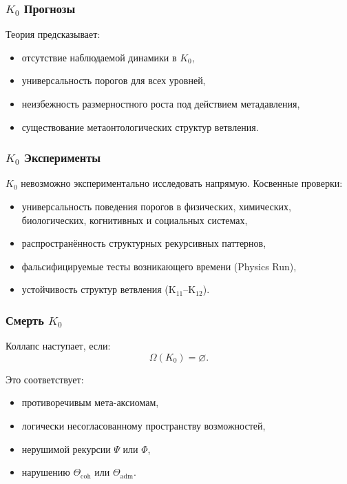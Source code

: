 \subsubsection{\texorpdfstring{$K_0$}{K_0} Прогнозы}

Теория предсказывает:
\begin{itemize}
    \item отсутствие наблюдаемой динамики в $K_0$,
    \item универсальность порогов для всех уровней,
    \item неизбежность размерностного роста под действием метадавления,
    \item существование метаонтологических структур ветвления.
\end{itemize}

\subsubsection{\texorpdfstring{$K_0$}{K_0} Эксперименты}

$K_0$ невозможно экспериментально исследовать напрямую.
Косвенные проверки:
\begin{itemize}
    \item универсальность поведения порогов в физических,
          химических, биологических, когнитивных и социальных системах,
    \item распространённость структурных рекурсивных паттернов,
    \item фальсифицируемые тесты возникающего времени (Physics Run),
    \item устойчивость структур ветвления (K$_{11}$–K$_{12}$).
\end{itemize}

\subsubsection{Смерть \texorpdfstring{$K_0$}{K_0}}

Коллапс наступает, если:
\[
\Omega(K_0) = \varnothing.
\]

Это соответствует:
\begin{itemize}
    \item противоречивым мета-аксиомам,
    \item логически несогласованному пространству возможностей,
    \item нерушимой рекурсии $\Psi$ или $\Phi$,
    \item нарушению $\Theta_{\mathrm{coh}}$ или $\Theta_{\mathrm{adm}}$.
\end{itemize}

